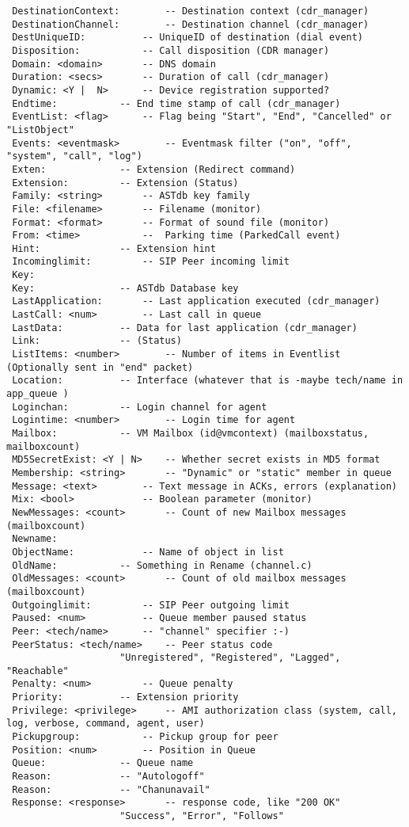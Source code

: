 \begin{verbatim}
 DestinationContext:		-- Destination context (cdr_manager)
 DestinationChannel:		-- Destination channel (cdr_manager)
 DestUniqueID:			-- UniqueID of destination (dial event)
 Disposition:			-- Call disposition (CDR manager)
 Domain: <domain>		-- DNS domain
 Duration: <secs>		-- Duration of call (cdr_manager)
 Dynamic: <Y |  N>		-- Device registration supported?
 Endtime:			-- End time stamp of call (cdr_manager)
 EventList: <flag>		-- Flag being "Start", "End", "Cancelled" or "ListObject"
 Events: <eventmask>		-- Eventmask filter ("on", "off", "system", "call", "log")
 Exten:				-- Extension (Redirect command)
 Extension:			-- Extension (Status)
 Family: <string>		-- ASTdb key family
 File: <filename>		-- Filename (monitor)
 Format: <format>		-- Format of sound file (monitor)
 From: <time>			--  Parking time (ParkedCall event)
 Hint:				-- Extension hint
 Incominglimit:			-- SIP Peer incoming limit
 Key:
 Key:				-- ASTdb Database key
 LastApplication:		-- Last application executed (cdr_manager)
 LastCall: <num>		-- Last call in queue
 LastData:			-- Data for last application (cdr_manager)
 Link:				-- (Status)
 ListItems: <number>		-- Number of items in Eventlist (Optionally sent in "end" packet)
 Location:			-- Interface (whatever that is -maybe tech/name in app_queue )
 Loginchan:			-- Login channel for agent
 Logintime: <number>		-- Login time for agent
 Mailbox:			-- VM Mailbox (id@vmcontext) (mailboxstatus, mailboxcount)
 MD5SecretExist: <Y | N>	-- Whether secret exists in MD5 format 
 Membership: <string>		-- "Dynamic" or "static" member in queue
 Message: <text>		-- Text message in ACKs, errors (explanation)
 Mix: <bool> 			-- Boolean parameter (monitor) 
 NewMessages: <count>	 	-- Count of new Mailbox messages (mailboxcount)
 Newname:		
 ObjectName:			-- Name of object in list
 OldName:			-- Something in Rename (channel.c)
 OldMessages: <count>		-- Count of old mailbox messages (mailboxcount)	
 Outgoinglimit:			-- SIP Peer outgoing limit
 Paused: <num>			-- Queue member paused status
 Peer: <tech/name>		-- "channel" specifier :-)
 PeerStatus: <tech/name>	-- Peer status code 
					"Unregistered", "Registered", "Lagged", "Reachable"
 Penalty: <num>			-- Queue penalty
 Priority:			-- Extension priority
 Privilege: <privilege>		-- AMI authorization class (system, call, log, verbose, command, agent, user)
 Pickupgroup:			-- Pickup group for peer
 Position: <num>		-- Position in Queue
 Queue:				-- Queue name
 Reason:			-- "Autologoff"
 Reason:			-- "Chanunavail"
 Response: <response>		-- response code, like "200 OK"
					"Success", "Error", "Follows"

\end{verbatim}
